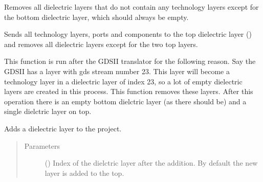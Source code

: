 \documentclass[letterpaper,10pt,english,openany]{sphinxmanual}
\begin{document}
\begin{fulllineitems}
\begin{fulllineitems}
\begin{quote}
\begin{description}
\end{description}\end{quote}

\end{fulllineitems}


\begin{fulllineitems}
\label{\detokenize{source/sonpy:sonpy.sonnet.removeEmptyDlayers}}
Removes all dielectric layers that do not contain any technology layers except for the bottom dielectric layer, which should always be empty.

\end{fulllineitems}


\begin{fulllineitems}
\label{\detokenize{source/sonpy:sonpy.sonnet.collapseDlayers}}
Sends all technology layers, ports and components to the top dielectric layer () and removes all dielectric layers except for the two top layers.

This function is run after the GDSII translator for the following reason. Say the GDSII has a layer with gds stream number 23. This layer will become a technology layer in a dielectric layer of index 23, so a lot of empty dielectric layers are created in this process. This function removes these layers. After this operation there is an empty bottom dielctric layer (as there should be) and a single dielctric layer on top.

\end{fulllineitems}


\begin{fulllineitems}
\label{\detokenize{source/sonpy:sonpy.sonnet.addDlayer}}
Adds a dielectric layer to the project.
\begin{quote}\begin{description}
\item[{Parameters}] \leavevmode
{} () \textendash{} Index of the dielctric layer after the addition. By default the new layer is added to the top.


\end{description}
\end{quote}
\end{fulllineitems}
\end{fulllineitems}
\end{document}
